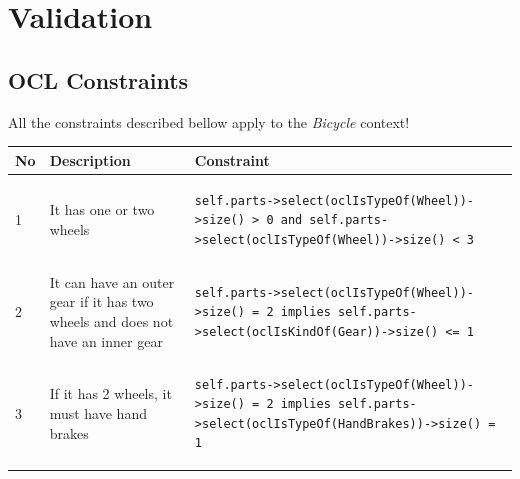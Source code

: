 \section{Validation}
\label{appendix.validation}

\subsection{OCL Constraints}
All the constraints described bellow apply to the \emph{Bicycle} context! 

\begin{table}[htp]
\begin{center}
	\lstset{captionpos=b,language=OCL,numbers=none,basicstyle=\small}
	\lstset{linewidth=0.60\textwidth}
	\begin{tabular*}{\textwidth}{p{} p{}
	l{}} \hline \hline \textbf{No} & \textbf{Description} &
	\textbf{Constraint} \\ \hline \hline 1	&	It has one or two wheels &
\begin{lstlisting}
self.parts->select(oclIsTypeOf(Wheel))->size() > 0 and self.parts->select(oclIsTypeOf(Wheel))->size() < 3
\end{lstlisting}  \\ \hline

2	&	It can have an outer gear if it has two wheels and does not have an inner gear &
\begin{lstlisting}
self.parts->select(oclIsTypeOf(Wheel))->size() = 2 implies self.parts->select(oclIsKindOf(Gear))->size() <= 1
\end{lstlisting}  \\ \hline

3	&	If it has 2 wheels, it must have hand brakes &
\begin{lstlisting}
self.parts->select(oclIsTypeOf(Wheel))->size() = 2 implies self.parts->select(oclIsTypeOf(HandBrakes))->size() = 1 \end{lstlisting}  \\ \hline


\end{tabular*}
\end{center}
\end{table}
